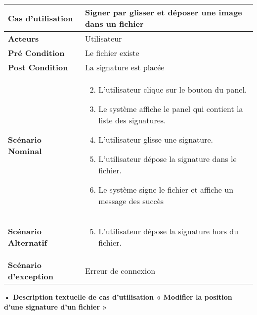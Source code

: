 \begin{longtable}{|p{5cm}|p{10cm}|}
\hline
\textbf{Cas d'utilisation}&Signer par glisser et déposer une image dans un fichier\\
\hline
\textbf{Acteurs}&Utilisateur\\
\hline
\textbf{Pré Condition}&Le fichier existe\\
\hline
\textbf{Post Condition}&La signature est placée\\
\hline
\textbf{Scénario Nominal}&
\vspace{-\baselineskip}
\begin{enumerate}
    \setcounter{enumi}{1}
    \item L'utilisateur clique sur le bouton du panel.
    \item Le système affiche le panel qui contient la liste des signatures.
    \item L'utilisateur glisse une signature.
    \item L'utilisateur dépose la signature dans le fichier.
    \item Le système signe le fichier et affiche un message des succès
    
\end{enumerate}\\
\hline
\textbf{Scénario Alternatif}&
\vspace{-\baselineskip}
\begin{enumerate}
    \setcounter{enumi}{4}
    \item L'utilisateur dépose la signature hors du fichier.
\end{enumerate}\\
\hline
\textbf{Scénario d'exception}&Erreur de connexion\\
\hline
\end{longtable}


\textbf{•	Description textuelle de cas d'utilisation « Modifier la position d'une signature d'un fichier »}


